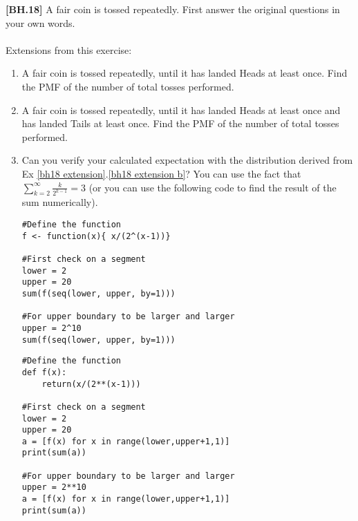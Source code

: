 \begin{exercise}\label{bh18 extension}
	\textbf{[BH.18]} A fair coin is tossed repeatedly. First answer the original questions in your own words.\\~\\
	Extensions from this exercise:
	\begin{enumerate}
		\item\label{bh18 extension a}  A fair coin is tossed repeatedly, until it has landed Heads at least once. Find the PMF of the number of total tosses performed.
		\item\label{bh18 extension b}  A fair coin is tossed repeatedly, until it has landed Heads at least once and has landed Tails at least once. Find the PMF of the number of total tosses performed.
		\item Can you verify your calculated expectation with the distribution derived from Ex \ref{bh18 extension}.\ref{bh18 extension b}? You can use the fact that $\sum_{k = 2}^\infty \frac{k}{2^{k-1}} =3$ (or you can use the following code to find the result of the sum numerically).
		\begin{verbatim}
#Define the function
f <- function(x){ x/(2^(x-1))}

#First check on a segment
lower = 2
upper = 20
sum(f(seq(lower, upper, by=1)))

#For upper boundary to be larger and larger 
upper = 2^10
sum(f(seq(lower, upper, by=1)))
		\end{verbatim}
		\begin{verbatim}
#Define the function
def f(x):
    return(x/(2**(x-1)))

#First check on a segment
lower = 2
upper = 20
a = [f(x) for x in range(lower,upper+1,1)]
print(sum(a))

#For upper boundary to be larger and larger 
upper = 2**10
a = [f(x) for x in range(lower,upper+1,1)]
print(sum(a))
		\end{verbatim}
	\end{enumerate}
\end{exercise}